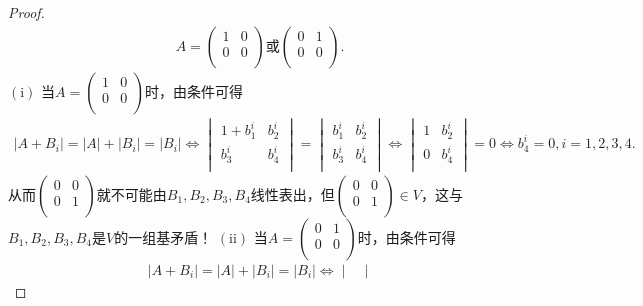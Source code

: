 \documentclass[../../main.tex]{subfiles}%
\begin{document}
\begin{proof}
\begin{align*}
A=\begin{pmatrix}
1&		0\\
0&		0\\
\end{pmatrix}\text{或}\begin{pmatrix}
0&		1\\
0&		0\\
\end{pmatrix}.
\end{align*}
$\left( \mathrm{i} \right)$ 当$A=\begin{pmatrix}
1&		0\\
0&		0\\
\end{pmatrix}$时，由条件可得
\begin{align*}
\left| A+B_i \right|=\left| A \right|+\left| B_i \right|=\left| B_i \right|\Longleftrightarrow \begin{vmatrix}
1+b_{1}^{i}&		b_{2}^{i}\\
b_{3}^{i}&		b_{4}^{i}\\
\end{vmatrix}=\begin{vmatrix}
b_{1}^{i}&		b_{2}^{i}\\
b_{3}^{i}&		b_{4}^{i}\\
\end{vmatrix}
\Longleftrightarrow \begin{vmatrix}
1&		b_{2}^{i}\\
0&		b_{4}^{i}\\
\end{vmatrix}=0\Longleftrightarrow b_{4}^{i}=0,i=1,2,3,4.
\end{align*}
从而$\begin{pmatrix}
0&		0\\
0&		1\\
\end{pmatrix}$就不可能由$B_1,B_2,B_3,B_4$线性表出，但$\begin{pmatrix}
0&		0\\
0&		1\\
\end{pmatrix} \in V$，这与$B_1,B_2,B_3,B_4$是$V$的一组基矛盾！
$\left( \mathrm{ii} \right)$ 当$A=\begin{pmatrix}
0&		1\\
0&		0\\
\end{pmatrix}$时，由条件可得
\begin{align*}
\left| A+B_i \right|=\left| A \right|+\left| B_i \right|=\left| B_i \right|\Longleftrightarrow \begin{vmatrix}

\end{vmatrix}
\end{align*}
\end{proof}
\end{document}

